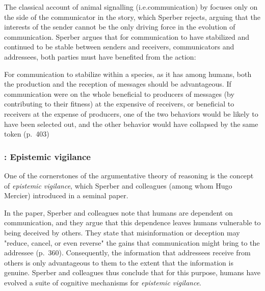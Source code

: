 The classical account of animal signalling (i.e.\@ communication) by \citet{DawkinsKrebs78} focuses only on the side of the communicator in the story, which Sperber rejects, arguing that the interests of the sender cannot be the only driving force in the evolution of communication.
Sperber argues that for communication to have stabilized and continued to be stable between senders and receivers, communicators and addressees, both parties must have benefited from the action:
\begin{quoting}
    For communication to stabilize within a species, as it has among humans, both the production and the reception of messages should be advantageous. If communication were on the whole beneficial to producers of messages (by contributing to their fitness) at the expensive of receivers, or beneficial to receivers at the expense of producers, one of the two behaviors would be likely to have been selected out, and the other behavior would have collapsed by the same token
\hfill (p.~403)
\end{quoting}


\subsubsection{\citet{Sperber10}: Epistemic vigilance}


One of the cornerstones of the argumentative theory of reasoning is the concept of \emph{epistemic vigilance}, which Sperber and colleagues (among whom Hugo Mercier) introduced in a seminal \citeyear{Sperber10} paper.

In the paper, Sperber and colleagues note that humans are dependent on communication, and they argue that this dependence leaves humans vulnerable to being deceived by others.
They state that misinformation or deception may "reduce, cancel, or even reverse" the gains that communication might bring to the addressee (p.~360).
Consequently, the information that addressees receive from others is only advantageous to them to the extent that the information is genuine.
Sperber and colleagues thus conclude that for this purpose, humans have evolved a suite of cognitive mechanisms for \emph{epistemic vigilance}.

